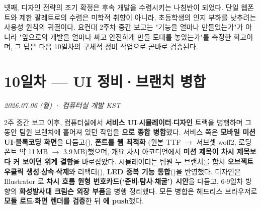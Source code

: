 넷째, 디자인 전략의 조기 확정은 후속 개발을 수렴시키는 나침반이 되었다. 단일 웹폰트와 제한 팔레트로의 수렴은 미학적 취향이 아니라, 초등학생의 인지 부하를 낮추려는 사용성 원칙의 귀결이다\cite{krug2014dontmakemethink,norman2013design}. 요컨대 2주차 중간 보고는 "기능을 얼마나 만들었는가"가 아니라 "앞으로의 개발을 얼마나 싸고 안전하게 만들 토대를 놓았는가"를 측정한 회고이며, 그 답은 다음 10일차의 구체적 정비 작업으로 곧바로 검증된다.

\chapter{10일차 — UI 정비·브랜치 병합}
\textit{2026.07.06 (월) · 컴퓨터실 개발 KST}

\begin{summarybox}
2주 중간 보고 이후, 컴퓨터실에서 \textbf{서비스 UI$\cdot$시뮬레이터$\cdot$디자인} 트랙을 병행하며
그동안 팀원 브랜치에 흩어져 있던 작업을 \textbf{ 으로 종합 병합}했다. 서비스 쪽은
\textbf{모바일 미션 UI$\cdot$블록코딩 화면}을 다듬고(), \textbf{폰트를 웹 최적화}
(원본 TTF $\to$ 서브셋 woff2, 로딩 폰트 약 11\,MB $\to$ 3.9\,MB)했으며, 개요 차시 아코디언에서
\textbf{미션 제목이 차시 제목보다 커 보이던 위계 결함}을 바로잡았다. 시뮬레이터는 팀원 두 브랜치를
합쳐 \textbf{오브젝트 우클릭 생성$\cdot$상속$\cdot$삭제}와  리팩터(),
\textbf{LED 중복 기능 통합}()을 반영했다. 디자인은 Illustrator 로
\textbf{차시 흐름 원형 번호카드(‘준비$\cdot$탐사$\cdot$채굴’) 시안}을 다듬고, 6$\cdot$9일차 방향의
\textbf{화성발사대 크림슨 외장 부품}을 병행 정리했다. 모든 병합은 헤드리스 브라우저로 \textbf{모듈
로드$\cdot$화면 렌더를 검증}한 뒤 \textbf{ 에 push}했다.
\end{summarybox}

\smallskip
{}

